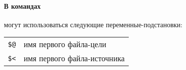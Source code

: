 \paragraph{В командах} могут использоваться следующие переменные-подстановки:\\

\begin{tabular}{l l}
\verb|$@| & имя первого файла-цели \\
\verb|$<| & имя первого файла-источника \\
\end{tabular}


\secup
